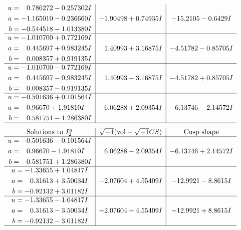 \documentclass[1p]{elsarticle_modified}
\theoremstyle{definition}
\newcommand{\I}{\sqrt{-1}}
\begin{document}
$$\begin{array}{c|c|c}
\begin{aligned}
u &= \phantom{-}0.786272 - 0.257302 I \\
a &= -1.165010 - 0.236660 I \\
b &= -0.544518 - 1.013380 I\end{aligned}
 & -1.90498 + 0.74935 I & -15.2105 - 0.6429 I \\ \hline\begin{aligned}
u &= -1.010700 + 0.772169 I \\
a &= \phantom{-}0.445697 + 0.983245 I \\
b &= \phantom{-}0.008357 + 0.919135 I\end{aligned}
 & \phantom{-}1.40993 + 3.16875 I & -4.51782 - 0.85705 I \\ \hline\begin{aligned}
u &= -1.010700 - 0.772169 I \\
a &= \phantom{-}0.445697 - 0.983245 I \\
b &= \phantom{-}0.008357 - 0.919135 I\end{aligned}
 & \phantom{-}1.40993 - 3.16875 I & -4.51782 + 0.85705 I \\ \hline\begin{aligned}
u &= -0.501636 + 0.101564 I \\
a &= \phantom{-}0.96670 + 1.91810 I \\
b &= \phantom{-}0.581751 - 1.286380 I\end{aligned}
 & \phantom{-}6.06288 + 2.09354 I & -6.13746 - 2.14572 I\\
 \hline 
 \end{array}$$\newpage$$\begin{array}{c|c|c}  
\text{Solutions to }I^u_{2}& \I (\text{vol} + \sqrt{-1}CS) & \text{Cusp shape}\\
 \hline 
\begin{aligned}
u &= -0.501636 - 0.101564 I \\
a &= \phantom{-}0.96670 - 1.91810 I \\
b &= \phantom{-}0.581751 + 1.286380 I\end{aligned}
 & \phantom{-}6.06288 - 2.09354 I & -6.13746 + 2.14572 I \\ \hline\begin{aligned}
u &= -1.33655 + 1.04817 I \\
a &= \phantom{-}0.31613 + 3.50034 I \\
b &= -0.92132 + 3.01182 I\end{aligned}
 & -2.07604 + 4.55409 I & -12.9921 - 8.8615 I \\ \hline\begin{aligned}
u &= -1.33655 - 1.04817 I \\
a &= \phantom{-}0.31613 - 3.50034 I \\
b &= -0.92132 - 3.01182 I\end{aligned}
 & -2.07604 - 4.55409 I & -12.9921 + 8.8615 I\\
 \hline 
 \end{array}$$\newpage
\end{document}
